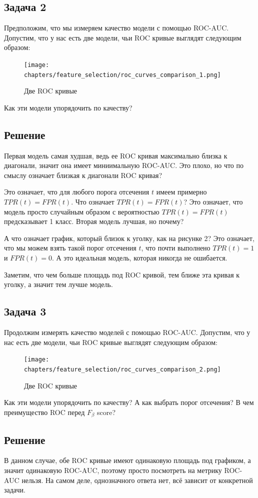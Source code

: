 \subsection*{Задача 2}
Предположим, что мы измеряем качество модели с помощью ROC-AUC. Допустим, что у нас есть две модели, чьи ROC кривые выглядят следующим образом:
\begin{figure}[h]
    \centering
    \texttt{[image: chapters/feature\_selection/roc\_curves\_comparison\_1.png]}
    \caption{Две ROC кривые}
\end{figure}
Как эти модели упорядочить по качеству?

\subsection*{Решение}
Первая модель самая худшая, ведь ее ROC кривая максимально близка к диагонали, значит она имеет миниимальную ROC-AUC.
Это плохо, но что по смыслу означает близкая к диагонали ROC кривая?

Это означает, что для любого порога отсечения $t$ имеем примерно $TPR(t) = FPR(t)$.
Что означает $TPR(t) = FPR(t)$? Это означает, что модель просто случайным образом с вероятностью $TPR(t)=FPR(t)$ предсказывает 1 класс.
Вторая модель лучшая, но почему?

А что означает график, который близок к уголку, как на рисунке 2?
Это означает, что мы можем взять такой порог отсечения $t$, что почти выполнено $TPR(t) = 1$ и $FPR(t) = 0$.
А это идеальная модель, которая никогда не ошибается.

Заметим, что чем больше площадь под ROC кривой, тем ближе эта кривая к уголку, а значит тем лучше модель.

\subsection*{Задача 3}
Продолжим измерять качество моделей с помощью ROC-AUC. Допустим, что у нас есть две модели, чьи ROC кривые выглядят следующим образом:
\begin{figure}[h]
    \centering
    \texttt{[image: chapters/feature\_selection/roc\_curves\_comparison\_2.png]}
    \caption{Две ROC кривые}
\end{figure}
Как эти модели упорядочить по качеству? А как выбрать порог отсечения? В чем преимущество ROC перед $F_{\beta}$ score?

\subsection*{Решение}
В данном случае, обе ROC кривые имеют одинаковую площадь под графиком, а значит одинаковую ROC-AUC, поэтому просто посмотреть на метрику ROC-AUC нельзя.
На самом деле, однозначного ответа нет, всё зависит от конкретной задачи.


